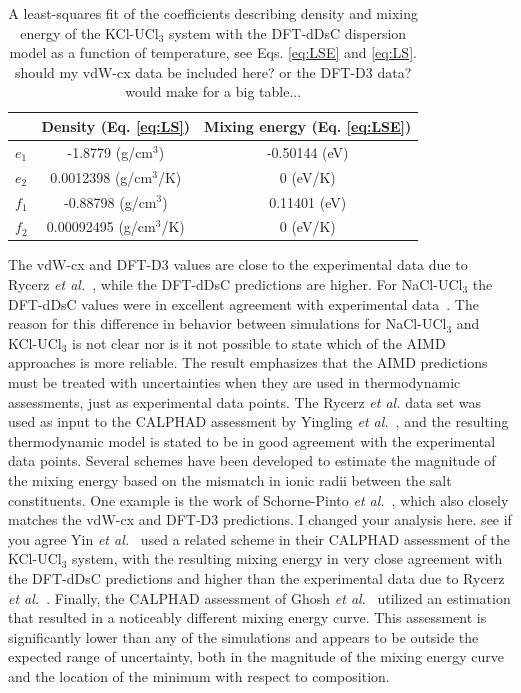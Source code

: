 \documentclass[preprint,3p,10pt,number,sort&compress]{elsarticle}
\begin{document}
\begin{table}[hb!]
\centering
\small
\caption{A least-squares fit of the coefficients describing density and mixing energy of the KCl-UCl$_3$ system with the DFT-dDsC dispersion model as a function of temperature, see Eqs. \ref{eq:LSE} and \ref{eq:LS}.{\color{red} should my vdW-cx data be included here? or the DFT-D3 data? would make for a big table...}}
\begin{tabular}{lcc}
\hline
\hline
&Density (Eq. \ref{eq:LS}) &Mixing energy (Eq. \ref{eq:LSE}) \\
\hline
$e_1$ &-1.8779 (g/cm$^3$) &-0.50144 (eV) \\
$e_2$ &0.0012398 (g/cm$^3$/K) &0 (eV/K)\\
$f_1$ &-0.88798 (g/cm$^3$) &0.11401 (eV) \\
$f_2$ &0.00092495 (g/cm$^3$/K) &0 (eV/K)\\
\hline
\hline
\end{tabular}
\label{table:LS}
\end{table}

The vdW-cx and DFT-D3 values are close to the experimental data due to Rycerz \textit{et al.}~\cite{Rycerz}, while the DFT-dDsC predictions are higher. For NaCl-UCl$_3$ the DFT-dDsC values were in excellent agreement with experimental data~\cite{Andersson}. The reason for this difference in behavior between simulations for NaCl-UCl$_3$ and KCl-UCl$_3$ is not clear nor is it not possible to state which of the AIMD approaches is more reliable. The result emphasizes that the AIMD predictions must be treated with uncertainties when they are used in thermodynamic assessments, just as experimental data points. 
The Rycerz \textit{et al.} data set was used as input to the CALPHAD assessment by Yingling \textit{et al.}~\cite{Yingling}, and the resulting thermodynamic model is stated to be in good agreement with the experimental data points. Several schemes have been developed to estimate the magnitude of the mixing energy based on the mismatch in ionic radii between the salt constituents. One example is the work of Schorne-Pinto \textit{et al.}~\cite{Pinto}, which also closely matches the vdW-cx and DFT-D3 predictions. {\color{red} I changed your analysis here. see if you agree}
Yin \textit{et al.}~\cite{YIN2020} used a related scheme in their CALPHAD assessment of the KCl-UCl$_3$ system, with the resulting mixing energy in very close agreement with the DFT-dDsC predictions and higher than the experimental data due to Rycerz \textit{et al.}~\cite{Rycerz}. Finally, the CALPHAD assessment of Ghosh \textit{et al.}~\cite{Ghosh} utilized an estimation that resulted in a noticeably different mixing energy curve. This assessment is significantly lower than any of the simulations and appears to be outside the expected range of uncertainty, both in the magnitude of the mixing energy curve and the location of the minimum with respect to composition. 
\end{document}
